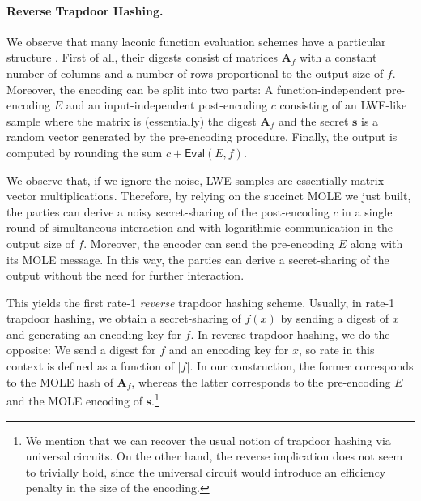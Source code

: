 \documentclass{theoretics}
\newcommand{\algofont}[1]{\ensuremath{\mathsf{#1}}}
\newcommand{\Eval}{\algofont{Eval}\xspace}
\begin{document}
\paragraph{Reverse Trapdoor Hashing.} We observe that many laconic function evaluation schemes have a particular structure \cite{FOCS:QuaWeeWic18,FOCS:HsiLinLuo23,C:DHMWW24,C:Wee24}. First of all, their digests consist of matrices $\mathbf{A}_f$ with a constant number of columns and a number of rows proportional to the output size of $f$. Moreover, the encoding can be split into two parts: A function-independent pre-encoding $E$ and an input-independent post-encoding $c$ consisting of an LWE-like sample where the matrix is (essentially) the digest $\mathbf{A}_f$ and the secret $\mathbf{s}$ is a random vector generated by the pre-encoding procedure. Finally, the output is computed by rounding the sum $c+\Eval(E, f)$. 

We observe that, if we ignore the noise, LWE samples are essentially matrix-vector multiplications. Therefore, by relying on the succinct MOLE we just built, the parties can derive a noisy secret-sharing of the post-encoding $c$ in a single round of simultaneous interaction and with logarithmic communication in the output size of $f$. Moreover, the encoder can send the pre-encoding $E$ along with its MOLE message. In this way, the parties can derive a secret-sharing of the output without the need for further interaction.

This yields the first rate-1 \emph{reverse} trapdoor hashing scheme. Usually, in rate-1 trapdoor hashing, we obtain a secret-sharing of $f(x)$ by sending a digest of $x$ and generating an encoding key for $f$. In reverse trapdoor hashing, we do the opposite: We send a digest for $f$ and an encoding key for $x$, {so rate in this context is defined as a function of $|f|$}. In our construction, the former corresponds to the MOLE hash of $\mathbf{A}_f$, whereas the latter corresponds to the pre-encoding $E$ and the MOLE encoding of $\mathbf{s}$.\footnote{We mention that we can recover the usual notion of trapdoor hashing via universal circuits. On the other hand, the reverse implication does not seem to trivially hold, since the universal circuit would introduce an efficiency penalty in the size of the encoding.}
\end{document}
